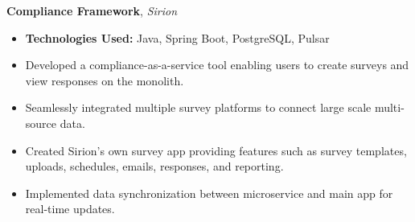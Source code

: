\documentclass[10pt, letterpaper]{article}
\newenvironment{highlights}{
    \begin{itemize}[topsep=0.05cm, parsep=0.05cm, partopsep=0pt, itemsep=0pt, leftmargin=10pt]
}{
    \end{itemize}
}
\newenvironment{onecolentry}{
    \begin{adjustwidth}{0cm}{0cm}
}{
    \end{adjustwidth}
}
\begin{document}
\vspace{0.05cm}

\begin{onecolentry}
    \textbf{Compliance Framework}, \textit{Sirion}
    \begin{highlights}
        \item \textbf{Technologies Used:} Java, Spring Boot, PostgreSQL, Pulsar
        \item Developed a compliance-as-a-service tool enabling users to create surveys and view responses on the monolith.
        \item Seamlessly integrated multiple survey platforms to connect large scale multi-source data.
        \item Created Sirion's own survey app providing features such as survey templates, uploads, schedules, emails, responses, and reporting.
        \item Implemented data synchronization between microservice and main app for real-time updates.
    \end{highlights}
\end{onecolentry}
\end{document}
